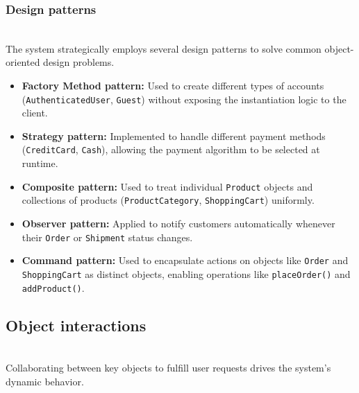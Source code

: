 \subsubsection{Design patterns}\label{xRkOx9rO3BHYp4PAqRGFn}
\\
The system strategically employs several design patterns to solve common object-oriented design problems.

\begin{itemize}
\item
\protect{}\label{S6omLNPCRh8xb5xvCL4ZL}
\textbf{Factory Method pattern:} Used to create different types of accounts (\texttt{AuthenticatedUser}, \texttt{Guest}) without exposing the instantiation logic to the client.
\item
\protect{}\label{qUp3ypLcv2aghdY1sEK_b}
\textbf{Strategy pattern:} Implemented to handle different payment methods (\texttt{CreditCard}, \texttt{Cash}), allowing the payment algorithm to be selected at runtime.
\item
\protect{}\label{FKle3j4ppsfRyGkA_ZiZk}
\textbf{Composite pattern:} Used to treat individual \texttt{Product} objects and collections of products (\texttt{ProductCategory}, \texttt{ShoppingCart}) uniformly.
\item
\protect{}\label{_jmdvNSQNBVhHjnF_Jgex}
\textbf{Observer pattern:} Applied to notify customers automatically whenever their \texttt{Order} or \texttt{Shipment} status changes.
\item
\protect{}\label{MYdTMLq48D-KYhnYIomXN}
\textbf{Command pattern:} Used to encapsulate actions on objects like \texttt{Order} and \texttt{ShoppingCart} as distinct objects, enabling operations like \texttt{placeOrder()} and \texttt{addProduct()}.
\end{itemize}

\subsection{Object interactions}\label{WStuK2YJWBHi0WR9p0yJ2}
\\
Collaborating between key objects to fulfill user requests drives the system's dynamic behavior.

